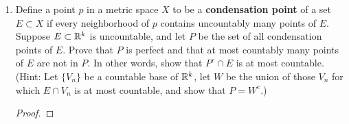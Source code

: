 \documentclass[../psets.tex]{subfiles}
\begin{document}
\begin{enumerate}[label={\textbf{\arabic*.}}]
    \item Define a point $p$ in a metric space $X$ to be a \textbf{condensation point} of a set $E\subset X$ if every neighborhood of $p$ contains uncountably many points of $E$. Suppose $E\subset\mathbb{R}^k$ is uncountable, and let $P$ be the set of all condensation points of $E$. Prove that $P$ is perfect and that at most countably many points of $E$ are not in $P$. In other words, show that $P^c\cap E$ is at most countable. (Hint: Let $\{V_n\}$ be a countable base of $\mathbb{R}^k$, let $W$ be the union of those $V_n$ for which $E\cap V_n$ is at most countable, and show that $P=W^c$.)
    \begin{proof}



\end{proof}
\end{enumerate}
\end{document}

